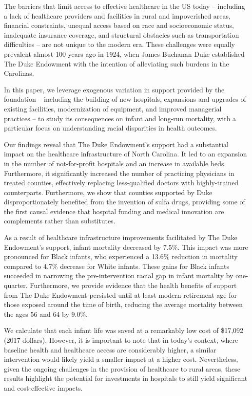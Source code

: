 \documentclass[12pt]{article}
\begin{document}
The barriers that limit access to effective healthcare in the US today -- including a lack of healthcare providers and facilities in rural and impoverished areas, financial constraints, unequal access based on race and socioeconomic status, inadequate insurance coverage, and structural obstacles such as transportation difficulties -- are not unique to the modern era.
These challenges were equally prevalent almost 100 years ago in 1924, when James Buchanan Duke established The Duke Endowment with the intention of alleviating such burdens in the Carolinas.

In this paper, we leverage exogenous variation in support provided by the foundation -- including the building of new hospitals, expansions and upgrades of existing facilities, modernization of equipment, and improved managerial practices -- to study its consequences on infant and long-run mortality, with a particular focus on understanding racial disparities in health outcomes. 

Our findings reveal that The Duke Endowment's support had a substantial impact on the healthcare infrastructure of North Carolina. It led to an expansion in the number of not-for-profit hospitals and an increase in available beds. Furthermore, it significantly increased the number of practicing physicians in  treated counties, effectively replacing less-qualified doctors with highly-trained counterparts. Furthermore, we show that counties supported by Duke disproportionately benefited from the invention of sulfa drugs, providing some of the first causal evidence that hospital funding and medical innovation are complements rather than substitutes. 


As a result of healthcare infrastructure improvements facilitated by The Duke Endowment's support, infant mortality decreased by 7.5\%. This impact was more pronounced for Black infants, who experienced a 13.6\% reduction in mortality compared to 4.7\% decrease for White infants. These gains for Black infants succeeded in narrowing the pre-intervention racial gap in infant mortality by one-quarter. 
Furthermore, we provide evidence that the health benefits of support from The Duke Endowment persisted until at least modern retirement age for those exposed around the time of birth, reducing the average mortality between the ages 56 and 64 by 9.0\%. 


We calculate that each infant life was saved at a remarkably low cost of \$17,092 (2017 dollars). However, it is important to note that in today's context, where baseline health and healthcare access are considerably higher, a similar intervention would likely yield a smaller impact at a higher cost. Nevertheless, given the ongoing challenges in the provision of healthcare to rural areas, these results highlight the potential for investments in hospitals to still yield significant and cost-effective impacts.
\end{document}
